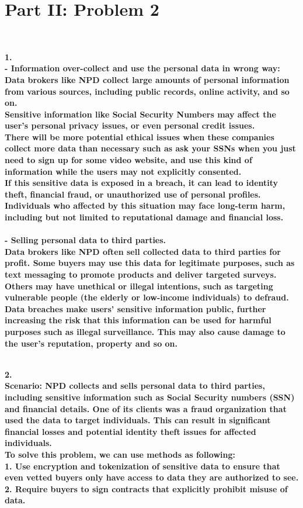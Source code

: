 \documentclass[letterpaper,11pt]{article}
\newcommand{\Paragraph}[1]{~\vspace*{-0.7\baselineskip}\\{\bf #1}}
\begin{document}
\section*{Part II: Problem 2}
\Paragraph{1. \\
	- Information over-collect and use the personal data in wrong way: \\
	Data brokers like NPD collect large amounts of personal information from various sources, including public records, online activity, and so on. \\
	Sensitive information like Social Security Numbers may affect the user's personal privacy issues, or even personal credit issues. \\
	There will be more potential ethical issues when these companies collect more data than necessary such as ask your SSNs when you just need to sign up for some 
	video website, and use this kind of information while the users may not explicitly consented. \\
	If this sensitive data is exposed in a breach, it can lead to identity theft, financial fraud, or unauthorized use of personal profiles. Individuals who affected by this situation 
	may face long-term harm, including but not limited to reputational damage and financial loss.\\ \\
	- Selling personal data to third parties. \\
	Data brokers like NPD often sell collected data to third parties for profit. Some buyers may use this data for legitimate purposes, such as text messaging to promote products and deliver 
	targeted surveys. Others may have unethical or illegal intentions, such as targeting vulnerable people (the elderly or low-income individuals) to defraud.
	Data breaches make users' sensitive information public, further increasing the risk that this information can be used for harmful purposes such as illegal surveillance. This may also cause 
	damage to the user's reputation, property and so on. 

}

\newpage
\Paragraph{2. \\
	Scenario: NPD collects and sells personal data to third parties, including sensitive information such as Social Security numbers (SSN) and financial details. One of its clients was a fraud 
	organization that used the data to target individuals. This can result in significant financial losses and potential identity theft issues for affected individuals.\\

	To solve this problem, we can use methods as following: \\
	1. Use encryption and tokenization of sensitive data to ensure that even vetted buyers only have access to data they are authorized to see.\\
	2. Require buyers to sign contracts that explicitly prohibit misuse of data.\\
}
\end{document}
